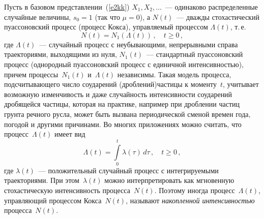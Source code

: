 \begin{multicols}{2}
Пусть в базовом представлении~(\ref{e2kk}) $X_1,X_2,\ldots$~--- одинаково
распределенные случайные величины, $s_0=1$ (так что $\mu=0$), а
$N(t)$~--- дважды стохастический пуассоновский процесс (процесс
Кокса), управляемый процессом $\Lambda(t)$, т.\,е.\
$$
N(t)=N_1\left(\Lambda(t)\right)\,,\quad t\ge 0\,,
$$
где $\Lambda(t)$~--- случайный процесс с неубывающими, непрерывными
справа траекториями, выходящими из нуля, $N_1(t)$~--- стандартный
пуассоновский процесс (однородный пуассоновский процесс с
единичной интенсивностью), причем процессы~$N_1(t)$ и~$\Lambda(t)$
независимы. Такая модель процесса, под\-счи\-ты\-ва\-юще\-го число
соударений (дроблений)\linebreak час\-ти\-цы к моменту~$t$, учитывает возможную
изменчивость и даже случайность интенсивности соударений
дробящейся частицы, которая на практике, например при дроблении
частиц грунта речного русла, может быть вызвана периодической
сменой времен года, погодой и другими причинами. Во многих
приложениях можно считать, что процесс~$\Lambda(t)$ имеет вид
$$
\Lambda(t)=\int\limits_{0}^{t}\lambda(\tau)\,d\tau\,,\quad t\ge0\,,
$$
где $\lambda(t)$~--- положительный случайный процесс с
интегрируемыми траекториями. При этом~$\lambda(t)$ можно
интерпретировать как мгновенную стохастическую интенсивность
процесса~$N(t)$. Поэтому иногда процесс~$\Lambda(t)$, управляющий
процессом Кокса~$N(t)$, называют {\it накопленной интенсивностью}
процесса~$N(t)$.


\end{multicols}
